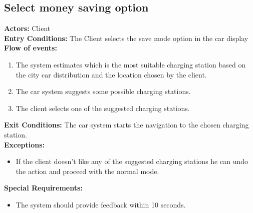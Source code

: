 \subsection{Select money saving option}
%
\textbf{Actors:}
Client \\
%
\textbf{Entry Conditions:}
The Client selects the save mode option in the car display\\
%
\textbf{Flow of events:}
\begin{enumerate}
\item The system estimates which is the most suitable charging station based on the city car distribution and the location chosen by the client. 
\item The car system suggests some possible charging stations.
\item The client selects one of the suggested charging stations.
\end{enumerate}
%
\textbf{Exit Conditions:}
The car system starts the navigation to the chosen charging station. \\
%
\textbf{Exceptions:}
\begin{itemize}
\item If the client doesn't like any of the suggested charging stations he can undo the action and proceed with the normal mode.
\end{itemize}
%
\textbf{Special Requirements:}
\begin{itemize}
\item The system should provide feedback within 10 seconds.
\end{itemize}
